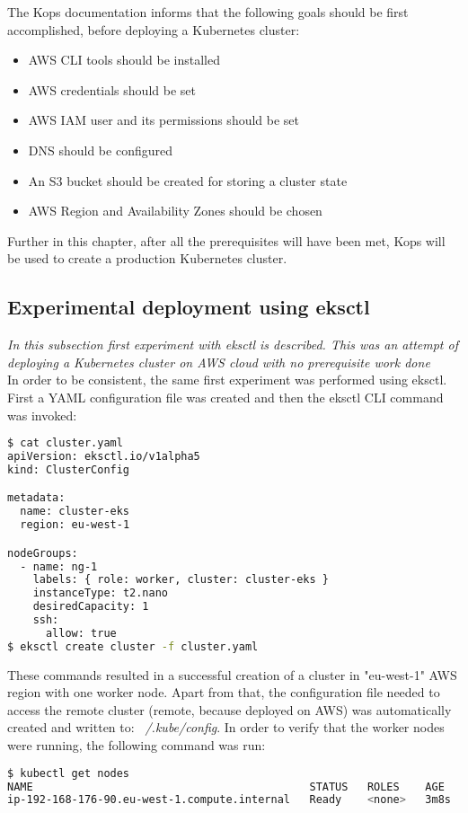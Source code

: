 The Kops documentation\cite{online-kops-aws} informs that the following goals should be first accomplished, before deploying a Kubernetes cluster:
\begin{itemize}
\item AWS CLI tools should be installed
\item AWS credentials should be set
\item AWS IAM user and its permissions should be set
\item DNS should be configured
\item An S3 bucket should be created for storing a cluster state
\item AWS Region and Availability Zones should be chosen
\end{itemize}

Further in this chapter, after all the prerequisites will have been met, Kops will be used to create a production Kubernetes cluster.

\subsection{Experimental deployment using eksctl}
\textit{In this subsection first experiment with eksctl is described. This was an attempt of deploying a Kubernetes cluster on AWS cloud with no prerequisite work done}
\\

In order to be consistent, the same first experiment was performed using eksctl. First a YAML configuration file was created and then the eksctl CLI command was invoked:
\begin{lstlisting}[basicstyle=\small,caption={Commands used to create a cluster with eksctl, without prerequisite steps performed},captionpos=b,language=Bash,xleftmargin=1cm]
$ cat cluster.yaml
apiVersion: eksctl.io/v1alpha5
kind: ClusterConfig

metadata:
  name: cluster-eks
  region: eu-west-1

nodeGroups:
  - name: ng-1
    labels: { role: worker, cluster: cluster-eks }
    instanceType: t2.nano
    desiredCapacity: 1
    ssh:
      allow: true
$ eksctl create cluster -f cluster.yaml
\end{lstlisting}

These commands resulted in a successful creation of a cluster in "eu-west-1" AWS region with one worker node. Apart from that, the configuration file needed to access the remote cluster (remote, because deployed on AWS) was automatically created and written to: \textit{~/.kube/config}. In order to verify that the worker nodes were running, the following command was run:
\begin{lstlisting}[basicstyle=\small,caption={Command used to list Kubernetes worker nodes to verify that one such node was running},captionpos=b,language=Bash,xleftmargin=1cm]
$ kubectl get nodes
NAME                                           STATUS   ROLES    AGE    VERSION
ip-192-168-176-90.eu-west-1.compute.internal   Ready    <none>   3m8s   v1.16.8
\end{lstlisting}

